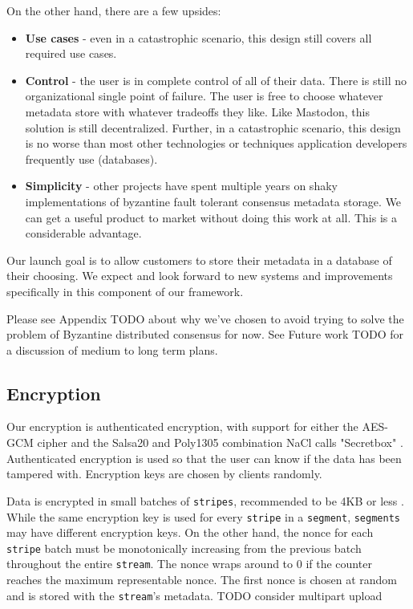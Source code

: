 \documentclass[a4paper,10pt]{article} \usepackage[utf8]{inputenc}
\newcommand{\x}[1]{{\tt #1}} \newcommand{\code}[1]{{\tt #1}}
\newcommand{\todo}[1]{{\color{red} TODO #1 }}
\begin{document}
On the other hand, there are a few upsides:
\begin{itemize}
\item {\bf Use cases} - even in a catastrophic scenario, this design still
  covers all required use cases.
\item {\bf Control} - the user is in complete control of all of their data.
  There is still no organizational single point of failure. The user is free
  to choose whatever metadata store with whatever tradeoffs they like. Like
  Mastodon\cite{mastodon}, this solution is still decentralized. Further, in a
  catastrophic scenario, this design is no worse than most other technologies or
  techniques application developers frequently use (databases).
\item {\bf Simplicity} - other projects have spent multiple years on shaky
  implementations of byzantine fault tolerant consensus metadata storage.
  We can get a useful product to market without doing this work at all.
  This is a considerable advantage.
\end{itemize}

Our launch goal is to allow customers to store their metadata in a database of
their choosing. We expect and look forward to new systems and improvements
specifically in this component of our framework.

Please see Appendix \todo{} about why we've chosen to avoid trying to solve
the problem of Byzantine distributed consensus for now. See Future work
\todo{} for a discussion of medium to long term plans.

\subsection{Encryption}

Our encryption is authenticated encryption, with support for either the
AES-GCM cipher and the Salsa20 and Poly1305 combination NaCl calls "Secretbox"
\cite{nacl-crypto}. Authenticated encryption is used so that the user can know
if the data has been tampered with. Encryption keys are chosen by clients
randomly.

Data is encrypted in small batches of \x{stripes}, recommended to be 4KB or
less \cite{nacl-packetlen}. While the same encryption key is used for every
\x{stripe} in a \x{segment}, \x{segments} may have
different encryption keys. On the other hand, the nonce for each \x{stripe}
batch must be monotonically increasing from the previous batch throughout the
entire \x{stream}. The nonce wraps around to 0 if the counter reaches the
maximum representable nonce. The first nonce is chosen at random and is stored
with the \x{stream}'s metadata.
\todo{consider multipart upload}
\end{document}
